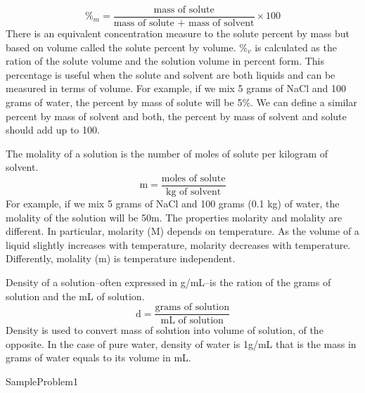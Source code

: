 \documentclass[main.tex]{subfiles}
\newcommand\chapterlabel{Ch-solutions}\setcounter{figurenewcounter}{0}\setcounter{tablenewcounter}{0}\setcounter{formulanewcounter}{0}
\begin{document}
\begin{description}
\begin{equation}
\boxed{ \%_m=\frac{\text{mass of solute}}{\text{mass of solute + mass of solvent}}\times 100}\label{\chapterlabel:equation4}\end{equation}
There is an equivalent concentration measure to the solute percent by mass but based on volume called the solute percent by volume. $\%_v$ is calculated as the ration of the solute volume and the solution volume in percent form. This percentage is useful when the solute and solvent are both liquids and can be measured in terms of volume.
For example, if we mix 5 grams of NaCl and 100 grams of water, the percent by mass of solute will be 5\%. We can define a similar percent by mass of solvent and both, the percent by mass of solvent and solute should add up to 100.
\item[\docfilehook{Molality, m}{}] 
The molality of a solution is the number of moles of solute per kilogram of solvent.
\begin{equation}
\boxed{ \text{m}=\frac{\text{moles of solute}}{\text{kg of solvent}}} \label{\chapterlabel:equation5}
\end{equation}
For example, if we mix 5 grams of NaCl and 100 grams (0.1 kg) of water, the molality of the solution will be 50m. The properties molarity and molality are different. In particular, molarity (M) depends on temperature. As the volume of a liquid slightly increases with temperature, molarity decreases with temperature. Differently, molality (m) is temperature independent.
\item[\docfilehook{Density of a solution, d}{}] 
Density of a solution--often expressed in g/mL--is the ration of the grams of solution and the mL of solution.
\begin{equation}
\boxed{ \text{d}=\frac{\text{grams of solution}}{\text{mL of solution}} }\label{\chapterlabel:equation6}
\end{equation}
Density is used to convert mass of solution into volume of solution, of the opposite. In the case of pure water, density of water is 1g/mL that is the mass in grams of water equals to its volume in mL. 


{SampleProblem1}




\end{description}
\end{document}
